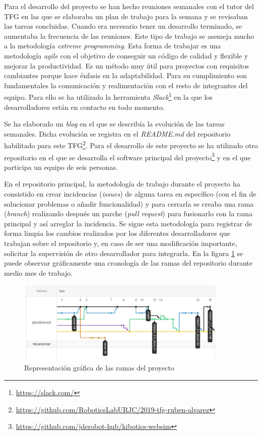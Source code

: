 Para el desarrollo del proyecto se han hecho reuniones semanales con el tutor del TFG en las que se elaboraba un plan de trabajo para la semana y se revisaban las tareas concluidas. Cuando era necesario tener un desarrollo terminado, se aumentaba la frecuencia de las reuniones.\newline
Este tipo de trabajo se asemeja mucho a la metodología \textit{extreme programming}. Esta forma de trabajar es una metodología \textit{agile} con el objetivo de conseguir un código de calidad y flexible y mejorar la productividad. Es un método muy útil para proyectos con requisitos cambiantes porque hace énfasis en la adaptabilidad. 
Para su cumplimiento son fundamentales la comunicación y realimentación con el resto de integrantes del equipo. Para ello se ha utilizado la herramienta \textit{Slack}\footnote{\url{https://slack.com/}} en la que los desarrolladores están en contacto en todo momento.

Se ha elaborado un \textit{blog} en el que se describía la evolución de las tareas semanales. Dicha evolución se registra en el \textit{README.md} del repositorio habilitado para este TFG\footnote{\url{https://github.com/RoboticsLabURJC/2019-tfg-ruben-alvarez}}.
Para el desarrollo de este proyecto se ha utilizado otro repositorio en el que se desarrolla el software principal del proyecto\footnote{\url{https://github.com/jderobot-hub/kibotics-websim}} y en el que participa un equipo de seis personas. 

En el repositorio principal, la metodología de trabajo durante el proyecto ha consistido en crear incidencias (\textit{issues}) de alguna tarea en específico (con el fin de solucionar problemas o añadir funcionalidad) y para cerrarla se creaba una rama (\textit{branch}) realizando después un parche (\textit{pull request}) para fusionarlo con la rama principal y así arreglar la incidencia. Se sigue esta metodología para registrar de forma limpia los cambios realizados por los diferentes desarrolladores que trabajan sobre el repositorio y, en caso de ser una modificación importante, solicitar la supervisión de otro desarrollador para integrarla. En la figura \ref{fig:github} se puede observar gráficamente una cronología de las ramas del repositorio durante medio mes de trabajo.

 \begin{figure}[H]
    \centering
    \includegraphics[width=0.9\textwidth]{img/github.jpg}
    \caption{Representación gráfica de las ramas del proyecto} \label{fig:github}
\end{figure}

